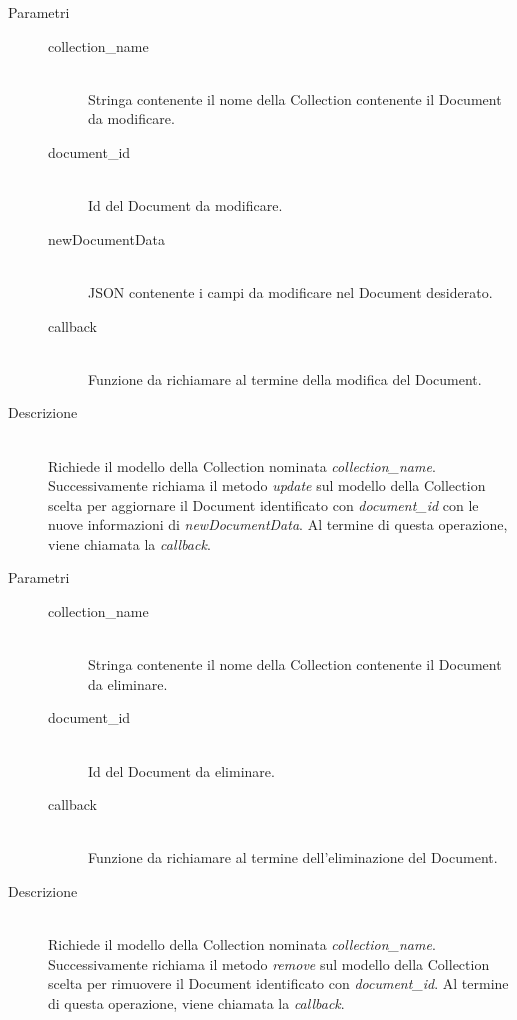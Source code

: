 \begin{description}
\begin{mldescription}
		\begin{description}
			\item[Parametri] \hfill
				\begin{description}
					\item[collection\_name] \hfill \\
					Stringa contenente il nome della Collection contenente il Document da modificare.
					\item[document\_id] \hfill \\
					Id del Document da modificare.
					\item[newDocumentData] \hfill \\
					JSON contenente i campi da modificare nel Document desiderato.					
					\item[callback] \hfill \\
					Funzione da richiamare al termine della modifica del Document.
				\end{description}
			\item[Descrizione] \hfill \\
			Richiede il modello della Collection nominata \textit{collection\_name}. Successivamente richiama il metodo \textit{update} sul modello della Collection scelta per aggiornare il Document identificato con \textit{document\_id} con le nuove informazioni di \textit{newDocumentData}. Al termine di questa operazione, viene chiamata la \textit{callback}.
		\end{description}
	
	 \hfill 
		\begin{description}
			\item[Parametri] \hfill
				\begin{description}
					\item[collection\_name] \hfill \\
					Stringa contenente il nome della Collection contenente il Document da eliminare.
					\item[document\_id] \hfill \\
					Id del Document da eliminare.
					\item[callback] \hfill \\
					Funzione da richiamare al termine dell'eliminazione del Document.
				\end{description}
			\item[Descrizione] \hfill \\
Richiede il modello della Collection nominata \textit{collection\_name}. Successivamente richiama
il metodo \textit{remove} sul modello della Collection scelta per rimuovere il Document identificato con \textit{document\_id}. Al termine di questa 	operazione, viene chiamata la \textit{callback}.
		\end{description}
		
\end{mldescription}

\end{description}

